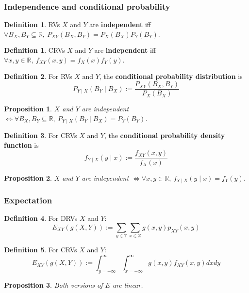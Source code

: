 \documentclass[12pt]{article}
\newtheorem*{prop*}{Proposition}
\theoremstyle{definition}
\newtheorem{defn}{Definition}[subsection]
\newtheorem*{defn*}{Definition}
\newcommand{\R}{\mathbb{R}}
\newcommand{\X}{\mathbb{X}}
\newcommand{\Y}{\mathbb{Y}}
\begin{document}
\subsubsection{Independence and conditional probability}

\begin{defn*}
  RVs $X$ and $Y$ are \textbf{independent} iff $\forall B_X, B_Y \subseteq \R,\ P_{XY}(B_X, B_Y) = P_X(B_X)P_Y(B_Y)$.
\end{defn*}

\begin{defn}
  CRVs $X$ and $Y$ are \textbf{independent} iff $\forall x, y \in \R,\ f_{XY}(x, y) = f_X(x)f_Y(y)$.
\end{defn}

\begin{defn}
  For RVs $X$ and $Y$, the \textbf{conditional probability distribution} is
  $$P_{Y \mid X}(B_Y \mid B_X) := \frac{P_{XY}(B_X, B_Y)}{P_X(B_X)}$$
\end{defn}

\begin{prop*}
  $X$ and $Y$ are independent $\iff \forall B_X, B_Y \subseteq \R,\ P_{Y \mid X}(B_Y \mid B_X) = P_Y(B_Y)$.
\end{prop*}

\begin{defn}
  For CRVs $X$ and $Y$, the \textbf{conditional probability density function} is
  $$f_{Y \mid X}(y \mid x) := \frac{f_{XY}(x, y)}{f_X(x)}$$
\end{defn}

\begin{prop*}
  $X$ and $Y$ are independent $\iff \forall x, y \in \R,\ f_{Y \mid X}(y \mid x) = f_Y(y)$.
\end{prop*}

\subsubsection{Expectation}

\begin{defn}
  For DRVs $X$ and $Y$:
  $$E_{XY}(g(X, Y)) := \sum_{y \in \Y}\sum_{x \in \X}g(x, y)p_{XY}(x, y)$$
\end{defn}

\begin{defn}
  For CRVs $X$ and $Y$:
  $$E_{XY}(g(X, Y)) := \int_{y = -\infty}^{\infty}\int_{x = -\infty}^{\infty}g(x, y)f_{XY}(x, y)dxdy$$
\end{defn}

\begin{prop*}
  Both versions of $E$ are linear.
\end{prop*}
\end{document}
